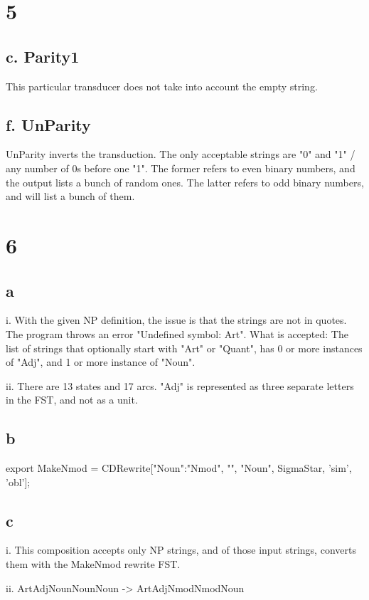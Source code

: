 \documentclass[12pt, letterpaper]{article}
\begin{document}
\section{5}
\subsection{c. Parity1}
This particular transducer does not take into account the empty string. 

\subsection{f. UnParity}
UnParity inverts the transduction. The only acceptable strings are "0" and "1" / any number of 0s before one "1". The former refers to even binary numbers, and the output lists a bunch of random ones. The latter refers to odd binary numbers, and will list a bunch of them. 


\section{6}
\subsection{a}
i. With the given NP definition, the issue is that the strings are not in quotes. The program throws an error "Undefined symbol: Art". 
What is accepted: The list of strings that optionally start with "Art" or "Quant", has 0 or more instances of "Adj", and 1 or more instance of "Noun". 

ii. There are 13 states and 17 arcs. "Adj" is represented as three separate letters in the FST, and not as a unit. 

\subsection{b}
export MakeNmod = CDRewrite["Noun":"Nmod", "", "Noun", SigmaStar, 'sim', 'obl'];

\subsection{c}
i. This composition accepts only NP strings, and of those input strings, converts them with the MakeNmod rewrite FST. 

ii. ArtAdjNounNounNoun -> ArtAdjNmodNmodNoun
\end{document}
